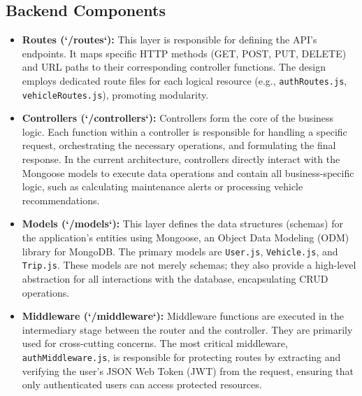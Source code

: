 \subsection{Backend Components}
\begin{itemize}
    \item \textbf{Routes (`/routes`):} This layer is responsible for defining the API's endpoints. It maps specific HTTP methods (GET, POST, PUT, DELETE) and URL paths to their corresponding controller functions. The design employs dedicated route files for each logical resource (e.g., \texttt{authRoutes.js}, \texttt{vehicleRoutes.js}), promoting modularity.

    \textgap
    
    \item \textbf{Controllers (`/controllers`):} Controllers form the core of the business logic. Each function within a controller is responsible for handling a specific request, orchestrating the necessary operations, and formulating the final response. In the current architecture, controllers directly interact with the Mongoose models to execute data operations and contain all business-specific logic, such as calculating maintenance alerts or processing vehicle recommendations.
    
    \textgap
    
    \item \textbf{Models (`/models`):} This layer defines the data structures (schemas) for the application's entities using Mongoose, an Object Data Modeling (ODM) library for MongoDB. The primary models are \texttt{User.js}, \texttt{Vehicle.js}, and \texttt{Trip.js}. These models are not merely schemas; they also provide a high-level abstraction for all interactions with the database, encapsulating CRUD operations.
    
    \textgap
    
    \item \textbf{Middleware (`/middleware`):} Middleware functions are executed in the intermediary stage between the router and the controller. They are primarily used for cross-cutting concerns. The most critical middleware, \texttt{authMiddleware.js}, is responsible for protecting routes by extracting and verifying the user's JSON Web Token (JWT) from the request, ensuring that only authenticated users can access protected resources.
\end{itemize}

